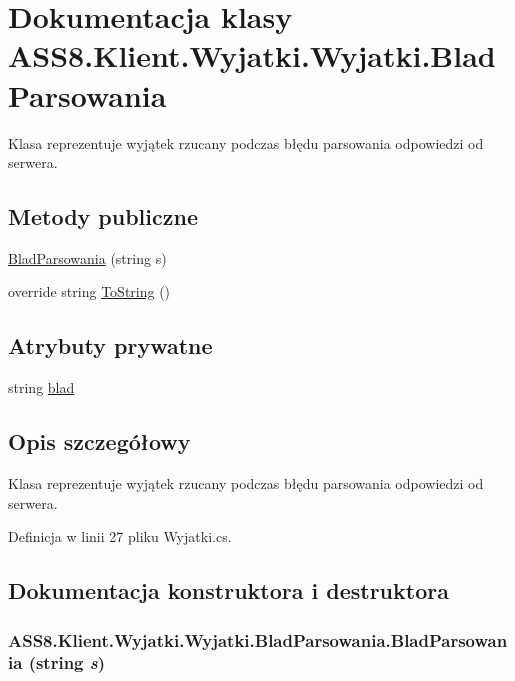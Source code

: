\hypertarget{a00033}{
\section{Dokumentacja klasy ASS8.Klient.Wyjatki.Wyjatki.BladParsowania}
\label{d0/dc0/a00033}
}
Klasa reprezentuje wyjątek rzucany podczas błędu parsowania odpowiedzi od serwera.  


\subsection*{Metody publiczne}
\begin{CompactItemize}
\item 
\hyperlink{a00033_2486cefed1f00cde9906c41c3c9b239e}{BladParsowania} (string s)
\item 
override string \hyperlink{a00033_541d37cb8f9616727ba8d9b695cfcd08}{ToString} ()
\end{CompactItemize}
\subsection*{Atrybuty prywatne}
\begin{CompactItemize}
\item 
string \hyperlink{a00033_19ce01427127765c40af0301cf1f9d05}{blad}
\end{CompactItemize}


\subsection{Opis szczegółowy}
Klasa reprezentuje wyjątek rzucany podczas błędu parsowania odpowiedzi od serwera. 



Definicja w linii 27 pliku Wyjatki.cs.

\subsection{Dokumentacja konstruktora i destruktora}
\hypertarget{a00033_2486cefed1f00cde9906c41c3c9b239e}{
\subsubsection[{BladParsowania}]{\setlength{\rightskip}{0pt plus 5cm}ASS8.Klient.Wyjatki.Wyjatki.BladParsowania.BladParsowania (string {\em s})}}
\label{d0/dc0/a00033_2486cefed1f00cde9906c41c3c9b239e}




